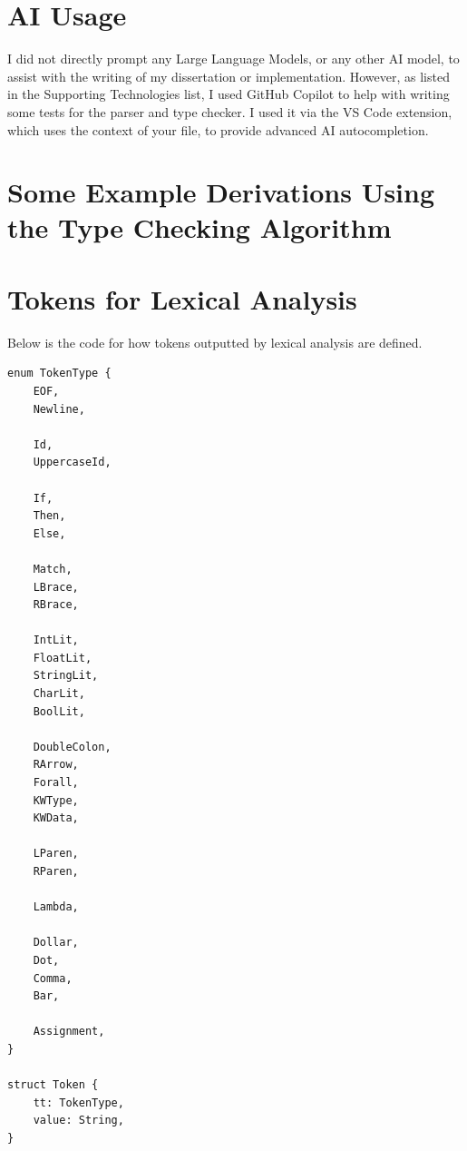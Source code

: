 
\appendix

\chapter{AI Usage}
\label{appx:ai_prompt}

I did not directly prompt any Large Language Models, or any other AI model, to assist with the writing of my dissertation or implementation. However, as listed in the Supporting Technologies list, I used GitHub Copilot to help with writing some tests for the parser and type checker. I used it via the VS Code extension, which uses the context of your file, to provide advanced AI autocompletion.


\chapter{Some Example Derivations Using the Type Checking Algorithm}


\chapter{Tokens for Lexical Analysis}
\label{appx:tokens}
Below is the code for how tokens outputted by lexical analysis are defined. 
\begin{lstlisting}
enum TokenType {
    EOF,
    Newline,

    Id,
    UppercaseId,

    If,
    Then,
    Else,

    Match,
    LBrace,
    RBrace,

    IntLit,
    FloatLit,
    StringLit,
    CharLit,
    BoolLit,

    DoubleColon,
    RArrow,
    Forall,
    KWType,
    KWData,

    LParen,
    RParen,

    Lambda,

    Dollar,
    Dot,
    Comma,
    Bar,

    Assignment,
}

struct Token {
    tt: TokenType,
    value: String,
}
\end{lstlisting}

